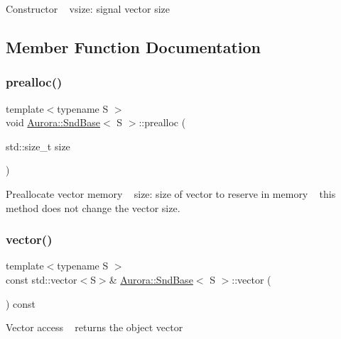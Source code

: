 Constructor ~\newline
vsize\+: signal vector size 

\subsection{Member Function Documentation}
\mbox{\label{class_aurora_1_1_snd_base_a5d57c3b735e5d583b4b4ae5f8e9cdf4c}} 
\subsubsection{\texorpdfstring{prealloc()}{prealloc()}}
{\footnotesize\ttfamily template$<$typename S $>$ \\
void \hyperlink{class_aurora_1_1_snd_base}{Aurora\+::\+Snd\+Base}$<$ S $>$\+::prealloc (\begin{DoxyParamCaption}\item[{std\+::size\+\_\+t}]{size }\end{DoxyParamCaption})\hspace{0.3cm}{\ttfamily [inline]}}

Preallocate vector memory ~\newline
size\+: size of vector to reserve in memory ~\newline
this method does not change the vector size. \mbox{\label{class_aurora_1_1_snd_base_acf9171085003208901e23c1f50520345}} 
\subsubsection{\texorpdfstring{vector()}{vector()}}
{\footnotesize\ttfamily template$<$typename S $>$ \\
const std\+::vector$<$S$>$\& \hyperlink{class_aurora_1_1_snd_base}{Aurora\+::\+Snd\+Base}$<$ S $>$\+::vector (\begin{DoxyParamCaption}{ }\end{DoxyParamCaption}) const\hspace{0.3cm}{\ttfamily [inline]}}

Vector access ~\newline
returns the object vector \mbox{\label{class_aurora_1_1_snd_base_af9e21aaf411b17f7a8221c991ce5d291}} 
